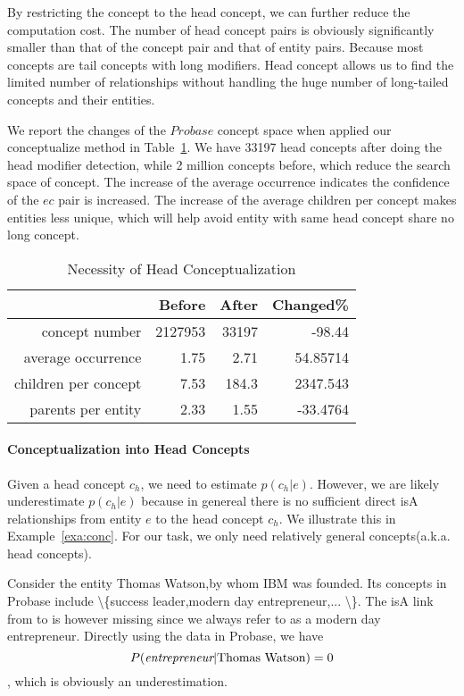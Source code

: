 By restricting the concept to the head concept, we can further reduce the computation cost.
The number of head concept pairs is obviously significantly smaller than that of the concept pair and that of entity pairs.
Because most concepts are tail concepts with long modifiers.
Head concept allows us to find the limited number of relationships without handling the huge number of long-tailed concepts and their entities.

We report the changes of the $Probase$ concept space when applied our conceptualize method in Table~\ref{tab:nhc}.
We have 33197 head concepts after doing the head modifier detection, while 2 million concepts before, which reduce the search space of concept.
The increase of the average occurrence indicates the confidence of the $e$\isa$c$ pair is increased.
The increase of the average children per concept makes entities less unique, which will help avoid entity with same head concept share no long concept.

\begin{table}[htbp]
  \centering
  \caption{Necessity of Head Conceptualization}
    \begin{tabular}{rrrr}
    \toprule
          & Before & After & Changed\% \\
    \midrule
    concept number & 2127953 & 33197 & -98.44 \\
    average occurrence & 1.75  & 2.71  & 54.85714 \\
    children per concept & 7.53  & 184.3 & 2347.543 \\
    parents per entity & 2.33  & 1.55  & -33.4764 \\
    \bottomrule
    \end{tabular}%
  \label{tab:nhc}%
\end{table}%

\paragraph{Conceptualization into Head Concepts}

Given a head concept $c_h$, we need to estimate $p(c_h|e)$.
However, we are likely underestimate $p(c_h|e)$ because in genereal there is no sufficient direct isA relationships from entity $e$ to the head concept $c_h$.
We illustrate this in Example~\ref{exa:conc}. 
For our task, we only need relatively general concepts(a.k.a. head concepts).
\begin{example}
\label{exa:conc}
Consider the entity \ac{Thomas Watson},by whom \ac{IBM} was founded. Its concepts in Probase include \ac{\{success leader,modern day entrepreneur,... \}}. The isA link from  to  is however missing since we always refer to  as a modern day entrepreneur. Directly using the data in Probase, we have $$P(\emph{entrepreneur}|{\tt \text{Thomas Watson}})=0$$, which is obviously an underestimation.
\end{example}

